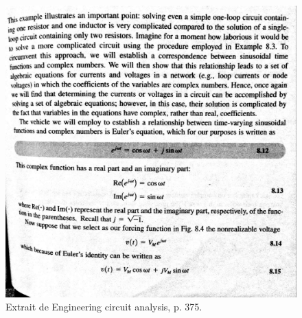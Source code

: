 \begin{figure}[h]
\begin{center}
\includegraphics[scale=0.5]{img/Irwin-1}
\end{center}
\caption{Extrait de \og Engineering circuit analysis\fg, p. 375.  \cite{Irwin}}%
\label{Trace 6}
\end{figure}

